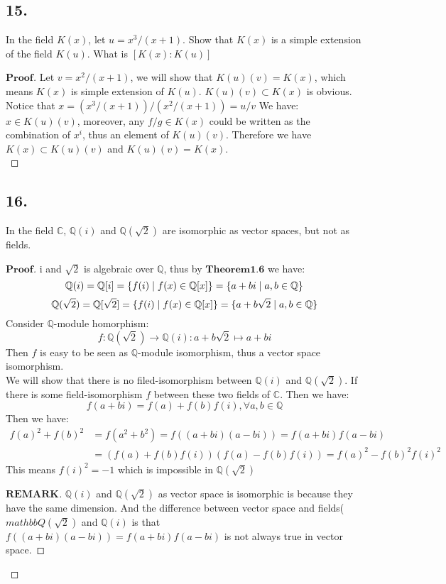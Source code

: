 \documentclass[a4paper, 11pt]{article}
\newenvironment{myprf}
{\renewcommand\qedsymbol{$ $}\begin{proof}[$\mathbf{Proof}$]}
  {\end{proof}}
\newenvironment{myremark}
{\renewcommand\qedsymbol{$ $}\begin{proof}[$\mathbf{REMARK}$]}
  {\end{proof}}
\begin{document}
 \subsection*{15.}
 In the field $K(x)$, let $u=x^3/(x+1)$. Show that $K(x)$ is a simple extension of the field $K(u)$. What is
 $[K(x):K(u)]$
 \begin{myprf}
         Let $v=x^2/(x+1)$, we will show that $K(u)(v)=K(x)$, which means $K(x)$ is simple extension of $K(u)$.
         $K(u)(v)\subset K(x)$ is obvious. Notice that $x=(x^3/(x+1))/(x^2/(x+1))=u/v$ We have:$x\in K(u)(v)$,
         moreover, any $f/g\in K(x)$ could be written as the combination of $x^i$, thus an element of $K(u)(v)$.
         Therefore we have $K(x)\subset K(u)(v)$ and $K(u)(v)=K(x)$.\\
 \end{myprf}

 \subsection*{16.}
 In the field $\mathbb{C}$, $\mathbb{Q}(i)$ and $\mathbb{Q}(\sqrt{2})$ are isomorphic as vector spaces, but not
 as fields.
 \begin{myprf}
         i and $\sqrt{2}$ is algebraic over $\mathbb{Q}$, thus by $\textbf{Theorem1.6}$ we have:
         $$
         \mathbb{Q}(i)=
         \mathbb{Q}[i]=\{f(i)\mid f(x)\in \mathbb{Q}[x]\}=\{a+bi\mid a,b\in \mathbb{Q}\} \\
         $$
         $$
         \mathbb{Q}(\sqrt{2})=
         \mathbb{Q}[\sqrt{2}]=\{f(i)\mid f(x)\in \mathbb{Q}[x]\}=\{a+b\sqrt{2}\mid a,b\in \mathbb{Q}\}\\
         $$ 
         Consider $\mathbb{Q}$-module homorphism:
         $$
         f:
         \mathbb{Q}(\sqrt{2})\rightarrow \mathbb{Q}(i):a+b\sqrt{2}
         \mapsto a+bi
         $$ Then $f$ is easy to be seen as $\mathbb{Q}$-module isomorphism, thus a vector space isomorphism.\\
         We will show that there is no filed-isomorphism between $\mathbb{Q}(i)$ and $\mathbb{Q}(\sqrt{2})$.
         If there is some field-isomorphism $f$ between these two fields of $\mathbb{C}$. Then we have:
         $$
         f(a+bi)=f(a)+f(b)f(i), \forall a,b\in \mathbb{Q}
         $$ Then we have:
         $$
         \begin{aligned}
                 f(a)^2+f(b)^2&=f(a^2+b^2)=f((a+bi)(a-bi))=f(a+bi)f(a-bi)\\&=(f(a)+f(b)f(i))(f(a)-f(b)f(i))=f(a)^2-f(b)^2f(i)^2
         \end{aligned}
         $$ This means $f(i)^2=-1$ which is impossible in $\mathbb{Q}(\sqrt{2})$
         \begin{myremark}
                 $\mathbb{Q}(i)$ and $\mathbb{Q}(\sqrt{2})$ as vector space is isomorphic is because they have
                 the same dimension. And the difference between vector space and fields($mathbb{Q}(\sqrt{2})$ and 
                 $\mathbb{Q}(i)$ is that 
                 $f((a+bi)(a-bi))=f(a+bi)f(a-bi)$ is not always true in vector space.
         \end{myremark}

        
         
 \end{myprf}
\end{document}
